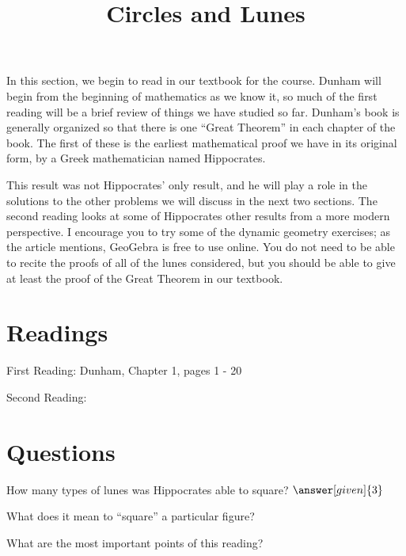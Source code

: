 \documentclass{ximera}
\title{Circles and Lunes}
\begin{document}
\begin{abstract}
\end{abstract}
\maketitle

In this section, we begin to read in our textbook for the course.  Dunham will begin from the beginning of mathematics as we know it, so much of the first reading will be a brief review of things we have studied so far.  Dunham's book is generally organized so that there is one ``Great Theorem'' in each chapter of the book.  The first of these is the earliest mathematical proof we have in its original form, by a Greek mathematician named Hippocrates.  

This result was not Hippocrates' only result, and he will play a role in the solutions to the other problems we will discuss in the next two sections.  The second reading looks at some of Hippocrates other results from a more modern perspective.  I encourage you to try some of the dynamic geometry exercises; as the article mentions, GeoGebra is free to use online.  You do not need to be able to recite the proofs of all of the lunes considered, but you should be able to give at least the proof of the Great Theorem in our textbook.




\section{Readings}

First Reading: Dunham, Chapter 1, pages 1 - 20

Second Reading: 




\section{Questions}

\begin{question}
How many types of lunes was Hippocrates able to square? $\answer[given]{3}$
\end{question}

\begin{question}
What does it mean to ``square'' a particular figure?
\begin{multipleChoice}
\end{multipleChoice}
\end{question}



\begin{question}
What are the most important points of this reading?
\begin{freeResponse}
\end{freeResponse}
\end{question}
\end{document}
